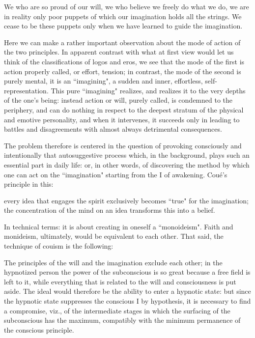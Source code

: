\begin{quotex}
We who are so proud of our will, we who believe we freely do what we do, we are in reality only poor puppets of which our imagination holds all the strings. We cease to be these puppets only when we have learned to guide the imagination.
\end{quotex} 

Here we can make a rather important observation about the mode of action of the two principles. In apparent contrast with what at first view would let us think of the classifications of logos and eros, we see that the mode of the first is action properly called, or effort, tension; in contrast, the mode of the second is purely mental, it is an ``imagining", a sudden and inner, effortless, self-representation. This pure ``imagining" realizes, and realizes it to the very depths of the one's being: instead action or will, purely called, is condemned to the periphery, and can do nothing in respect to the deepest stratum of the physical and emotive personality, and when it intervenes, it succeeds only in leading to battles and disagreements with almost always detrimental consequences.

The problem therefore is centered in the question of provoking consciously and intentionally that autosuggestive process which, in the background, plays such an essential part in daily life: or, in other words, of discovering the method by which one can act on the ``imagination" starting from the I of awakening. Coué's principle in this:

\begin{quotex}
every idea that engages the spirit exclusively becomes ``true" for the imagination; the concentration of the mind on an idea transforms this into a belief. 
\end{quotex}

In technical terms: it is about creating in oneself a ``monoideism". Faith and monideism, ultimately, would be equivalent to each other. That said, the technique of couism is the following:

\begin{quotex}
The principles of the will and the imagination exclude each other; in the hypnotized person the power of the subconscious is so great because a free field is left to it, while everything that is related to the will and consciousness is put aside. The ideal would therefore be the ability to enter a hypnotic state: but since the hypnotic state suppresses the conscious I by hypothesis, it is necessary to find a compromise, viz., of the intermediate stages in which the surfacing of the subconscious has the maximum, compatibly with the minimum permanence of the conscious principle. 
\end{quotex}

